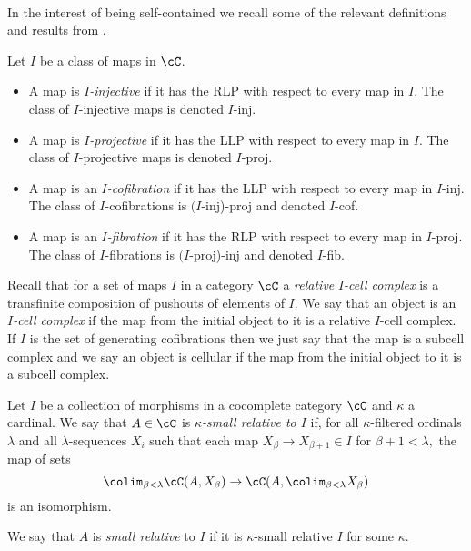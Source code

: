 \documentclass[leqno,oneside,english]{elsarticle}
\newcounter{enumisaved}
\newlength{\thmsaved}
\begin{document}
{{    {}  \ifshowcomplete
  \ 
  {
In the interest of being self-contained we recall
some of the relevant definitions and results from
\cite[\S~2.1]{Hov99}.
\begin{defn*}\label{def:I-injective}
  Let $I$ be a class of maps in $\cC$. 
  \begin{itemize}
  \item A map is $I${\em{-injective}} if it has the RLP with respect
    to every map in $I$. The class of $I$-injective maps is denoted
    $I$-inj.
  \item A map is $I${\em{-projective}} if it has the LLP with respect
    to every map in $I$. The class of $I$-projective maps is denoted
    $I$-proj.
  \item A map is an $I${\em{-cofibration}} if it has the LLP with
    respect to every map in $I$-inj.  The class of $I$-cofibrations
    is $(I$-inj)-proj and denoted $I$-cof.
  \item A map is an $I${\em{-fibration}} if it has the RLP with
    respect to every map in $I$-proj. The class of $I$-fibrations 
    is $(I$-proj)-inj and denoted $I$-fib.
  \end{itemize}
\end{defn*}

Recall that for a set of maps $I$ in a category $\cC$ a
{\em{relative}} $I${\em{-cell complex}} is a transfinite composition
of pushouts of elements of $I$. We say that an object is an $I${\em{-cell
complex}} if the map from the initial object to it is a relative
$I$-cell complex. If $I$ is the set of generating cofibrations then we
just say that the map is a subcell complex and we say an object is
cellular if the map from the initial object to it is a subcell complex. 

\begin{defn*}\label{def:relative-smallness}
  Let $I$ be a collection of morphisms in a cocomplete category $\cC$ 
  and $\kappa$ a cardinal. We say that $A\in \cC$ is
  $\kappa${\em{-small relative to }}$I$ if, for all $\kappa$-filtered
  ordinals $\lambda$ and all $\lambda$-sequences $X_i$ such that each
  map $X_{\beta}\rightarrow X_{\beta+1}\in I$ for $\beta+1<\lambda,$
  the map of sets 
  \[
  \colim_{\beta<\lambda}\cC(A,X_{\beta})\rightarrow
 \cC(A,\colim_{\beta<\lambda}X_{\beta})
  \]
  is an isomorphism. 
  
  We say that $A$ is {\em{small relative}} to
  $I$ if it is $\kappa$-small relative $I$ for some
  $\kappa.$ 
\end{defn*}

}}}
\end{document}
